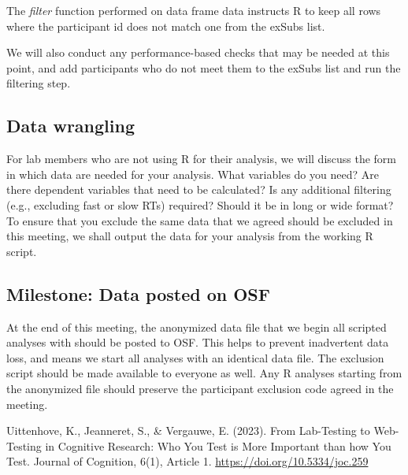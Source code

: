 \documentclass[
  12pt,
]{book}
\begin{document}
The \emph{filter} function performed on data frame data instructs R to keep all rows where the participant id does not match one from the exSubs list.

We will also conduct any performance-based checks that may be needed at this point, and add participants who do not meet them to the exSubs list and run the filtering step.

\subsection{Data wrangling}\label{data-wrangling}

For lab members who are not using R for their analysis, we will discuss the form in which data are needed for your analysis. What variables do you need? Are there dependent variables that need to be calculated? Is any additional filtering (e.g., excluding fast or slow RTs) required? Should it be in long or wide format? To ensure that you exclude the same data that we agreed should be excluded in this meeting, we shall output the data for your analysis from the working R script.

\subsection{Milestone: Data posted on OSF}\label{milestone-data-posted-on-osf}

At the end of this meeting, the anonymized data file that we begin all scripted analyses with should be posted to OSF. This helps to prevent inadvertent data loss, and means we start all analyses with an identical data file. The exclusion script should be made available to everyone as well. Any R analyses starting from the anonymized file should preserve the participant exclusion code agreed in the meeting.

Uittenhove, K., Jeanneret, S., \& Vergauwe, E. (2023). From Lab-Testing to Web-Testing in Cognitive Research: Who You Test is More Important than how You Test. Journal of Cognition, 6(1), Article 1. \url{https://doi.org/10.5334/joc.259}


\end{document}
